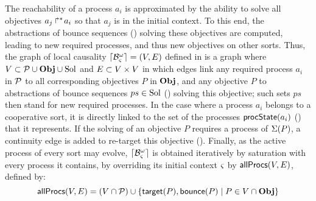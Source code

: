 The reachability of a process $a_i$ is approximated by the ability to solve all objectives $\mbox{${a}_{j}\Rsh^*\!{a}_{i}$}$ so that $a_j$ is in the initial context.
To this end, the abstractions of bounce sequences () solving these objectives are computed, leading to new required processes, and thus new objectives on other sorts.
Thus, the graph of local causality $\lceil \mathcal{B}_\varsigma^\omega\rceil = (V, E)$ defined in  is a graph where $V \subset \mathcal{P} \cup \mathbf{Obj} \cup \mathrm{Sol}$ and $E \subset V \times V$
in which edges link any required process $a_i$ in $\mathcal{P}$ to all corresponding objectives $P$ in $\mathbf{Obj}$,
and any objective $P$ to abstractions of bounce sequences $ps \in \mathrm{Sol}$ () solving this objective;
such sets $ps$ then stand for new required processes.
In the case where a process $a_i$ belongs to a cooperative sort, it is directly linked to the set of the processes $\mathsf{procState}(a_i)$ () that it represents.
If the solving of an objective $P$ requires a process of $\Sigma(P)$, a continuity edge is added to re-target this objective ().
Finally, as the active process of every sort may evolve, $\lceil \mathcal{B}_\varsigma^\omega\rceil$ is obtained iteratively by saturation with every process it contains,
\ie by overriding its initial context $\varsigma$ by $\mathsf{allProcs}(V, E)$, defined by:
$$\mathsf{allProcs}(V, E) = (V \cap \mathcal{P}) \cup \{ \mathsf{target}(P), \mathsf{bounce}(P) \mid P \in V \cap \mathbf{Obj} \}$$



